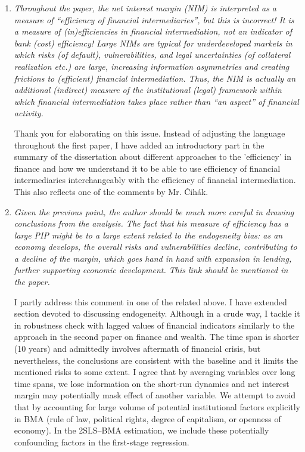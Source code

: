 \begin{enumerate}
    \item \textit{Throughout the paper, the net interest margin (NIM) is interpreted as a measure of ``efficiency of financial intermediaries'', but this is incorrect! It is a measure of (in)efficiencies in financial intermediation, not an indicator of bank (cost) efficiency! Large NIMs are typical for underdeveloped markets in which risks (of default), vulnerabilities, and legal uncertainties (of collateral realization etc.) are large, increasing information asymmetries and creating frictions to (efficient) financial intermediation. Thus, the NIM is actually an additional (indirect) measure of the institutional (legal) framework within which financial intermediation takes place rather than ``an aspect'' of financial activity.}

    Thank you for elaborating on this issue. Instead of adjusting the language throughout the first paper, I have added an introductory part in the summary of the dissertation about different approaches to the 'efficiency' in finance and how we understand it to be able to use efficiency of financial intermediaries interchangeably with the efficiency of financial intermediation. This also reflects one of the comments by Mr. \v{C}ih\'{a}k.

    \item \textit{Given the previous point, the author should be much more careful in drawing conclusions from the analysis. The fact that his measure of efficiency has a large PIP might be to a large extent related to the endogeneity bias: as an economy develops, the overall risks and vulnerabilities decline, contributing to a decline of the margin, which goes hand in hand with expansion in lending, further supporting economic development. This link should be mentioned in the paper.}    
    
    I partly address this comment in one of the related above. I have extended section devoted to discussing endogeneity. Although in a crude way, I tackle it in robustness check with lagged values of financial indicators similarly to the approach in the second paper on finance and wealth. The time span is shorter (10 years) and admittedly involves aftermath of financial crisis, but nevertheless, the conclusions are consistent with the baseline and it limits the mentioned risks to some extent. I agree that by averaging variables over long time spans, we lose information on the short-run dynamics and net interest margin may potentially mask effect of another variable. We attempt to avoid that by accounting for large volume of potential institutional factors explicitly in \ac{BMA} (rule of law, political rights, degree of capitalism, or openness of economy). In the 2SLS--BMA estimation, we include these potentially confounding factors in the first-stage regression.


\end{enumerate}
